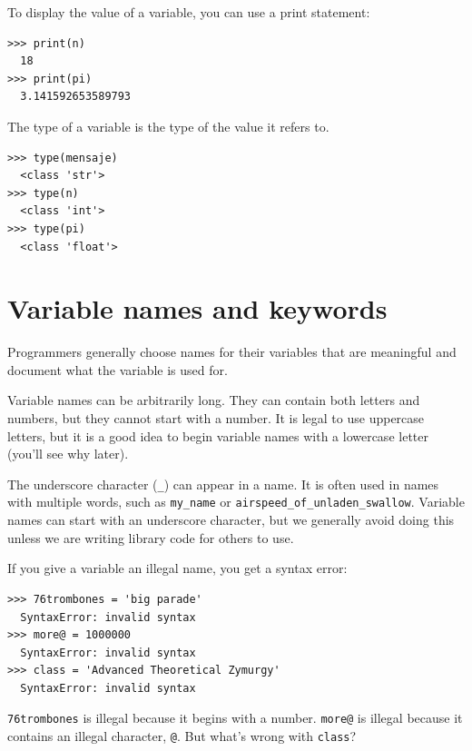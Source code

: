 To display the value of a variable, you can use a print statement:

\begin{Verbatim}[frame=single]
>>> print(n)
  18
>>> print(pi)
  3.141592653589793
\end{Verbatim}


The type of a variable is the type of the value it refers to.

\begin{Verbatim}[frame=single]
>>> type(mensaje)
  <class 'str'>
>>> type(n)
  <class 'int'>
>>> type(pi)
  <class 'float'>
\end{Verbatim}


\hypertarget{nombres-de-variables-y-palabras-claves}{%
\section{Variable names and keywords}\label{nombres-de-variables-y-palabras-claves}}


Programmers generally choose names for their variables that are meaningful and document what the variable is used for.

Variable names can be arbitrarily long. They can contain both letters and numbers, but they cannot start with a number. It is legal to use uppercase letters, but it is a good idea to begin variable names with a lowercase letter (you'll see why later).

The underscore character (\texttt{\_}) can appear in a name. It is often used in names with multiple words, such as
\texttt{my\_name} or \texttt{airspeed\_of\_unladen\_swallow}. Variable names can start with an underscore character, but we generally avoid doing this unless we are writing library code for others to use.


If you give a variable an illegal name, you get a syntax error:

\begin{Verbatim}[frame=single]
>>> 76trombones = 'big parade'
  SyntaxError: invalid syntax
>>> more@ = 1000000
  SyntaxError: invalid syntax
>>> class = 'Advanced Theoretical Zymurgy'
  SyntaxError: invalid syntax
\end{Verbatim}

\texttt{76trombones} is illegal because it begins with a number.
\texttt{more@} is illegal because it contains an illegal character,
\texttt{@}. But what's wrong with \texttt{class}?

